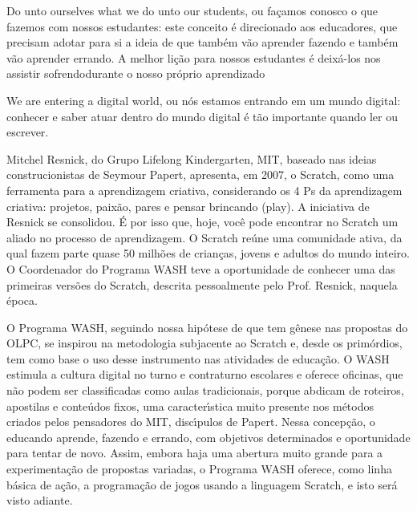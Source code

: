 \documentclass[
12pt,		%
openright,	%
twoside,  %
a4paper,			%
chapter=TITLE,		%
english,			%
french,				%
spanish,			%
brazil				%
]{USPSC-classe/USPSC}
\begin{document}
\begin{alineas}
\item Do unto ourselves what we do unto our students, ou \textquotedbl fa\c{c}amos conosco o que fazemos com nossos estudantes\textquotedbl : este conceito \'e direcionado aos educadores, que precisam adotar para si a ideia de que tamb\'em v\~ao aprender fazendo e tamb\'em v\~ao aprender errando. A melhor li\c{c}\~ao para nossos estudantes \'e deix\'a-los nos assistir \textquotedbl sofrendo\textquotedbl  durante o nosso pr\'oprio aprendizado
\item We are entering a digital world, ou \textquotedbl n\'os estamos entrando em um mundo digital\textquotedbl : conhecer e saber atuar dentro do mundo digital \'e t\~ao importante quando ler ou escrever.
\end{alineas}

Mitchel Resnick, do Grupo Lifelong Kindergarten, MIT, baseado nas ideias construcionistas de Seymour Papert, apresenta, em 2007, o Scratch, como uma ferramenta para a aprendizagem criativa, considerando os 4 Ps da aprendizagem criativa: projetos, paix\~ao, pares e pensar brincando (play). A iniciativa de Resnick se consolidou. \'E por isso que, hoje, voc\^e pode encontrar no Scratch um aliado no processo de aprendizagem. O Scratch re\'une uma comunidade ativa, da qual fazem parte quase 50 milh\~oes de crian\c{c}as, jovens e adultos do mundo inteiro. O Coordenador do Programa WASH teve a oportunidade de conhecer uma das primeiras vers\~oes do Scratch, descrita pessoalmente pelo Prof. Resnick, naquela \'epoca.










O Programa WASH, seguindo nossa hip\'otese de que tem g\^enese nas propostas do OLPC, se inspirou na metodologia subjacente ao Scratch e, desde os prim\'ordios, tem como base o uso desse instrumento nas atividades de educa\c{c}\~ao. O WASH estimula a cultura digital no turno e contraturno escolares e oferece oficinas, que n\~ao podem ser classificadas como aulas tradicionais, porque abdicam de roteiros, apostilas e conte\'udos fixos, uma caracter\'{\i}stica muito presente nos m\'etodos criados pelos pensadores do MIT, disc\'{\i}pulos de Papert. Nessa concep\c{c}\~ao, o educando aprende, fazendo e errando, com objetivos determinados e oportunidade para tentar de novo. Assim, embora haja uma abertura muito grande para a experimenta\c{c}\~ao de propostas variadas, o Programa WASH oferece, como linha b\'asica de a\c{c}\~ao, a programa\c{c}\~ao de jogos usando a linguagem Scratch, e isto ser\'a visto adiante.
\end{document}
